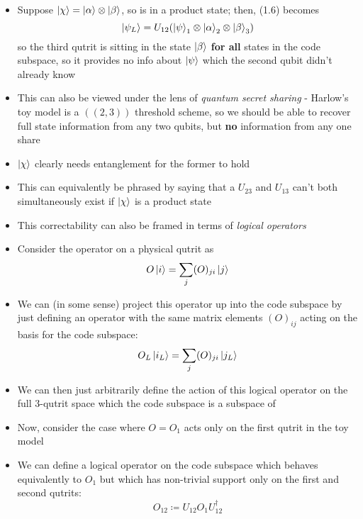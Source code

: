 \documentclass[12pt,a4paper]{article}
\numberwithin{equation}{section}
\begin{document}
\begin{itemize}
		\item Suppose $\ket{\chi}=\ket{\alpha}\otimes\ket{\beta}$, so is in a product state; then, (1.6) becomes
		\begin{equation}
			\ket{\psi_{L}}=U_{12}(\ket{\psi}_{1}\otimes\ket{\alpha}_{2}\otimes\ket{\beta}_{3})
		\end{equation}
		so the third qutrit is sitting in the state $\ket{\beta}$ \textbf{for all} states in the code subspace, so it provides no info about $\ket{\psi}$ which the second qubit didn't already know 
		\item This can also be viewed under the lens of \textit{quantum secret sharing} - Harlow's toy model is a $((2,3))$ threshold scheme, so we should be able to recover full state information from any two qubits, but \textbf{no} information from any one share
		\item $\ket{\chi}$ clearly needs entanglement for the former to hold
		\item This can equivalently be phrased by saying that a $U_{23}$ and $U_{13}$ can't both simultaneously exist if $\ket{\chi}$ is a product state 
		\item This correctability can also be framed in terms of \textit{logical operators}
		\item Consider the operator on a physical qutrit as
		\begin{equation}
			O\ket{i}=\sum_{j}(O)_{ji}\ket{j}
		\end{equation}
		\item We can (in some sense) project this operator up into the code subspace by just defining an operator with the same matrix elements $(O)_{ij}$ acting on the basis for the code subspace:
		\begin{equation}
			O_{L}\ket{i_{L}}=\sum_{j}(O)_{ji}\ket{j_{L}}
		\end{equation}
		\item We can then just arbitrarily define the action of this logical operator on the full 3-qutrit space which the code subspace is a subspace of
		\item Now, consider the case where $O=O_{1}$ acts only on the first qutrit in the toy model
		\item We can define a logical operator on the code subspace which behaves equivalently to $O_{1}$ but which has non-trivial support only on the first and second qutrits:
		\begin{equation}
			O_{12}\coloneqq U_{12}O_{1} U_{12}^{\dagger}
		\end{equation}

\end{itemize}
\end{document}
